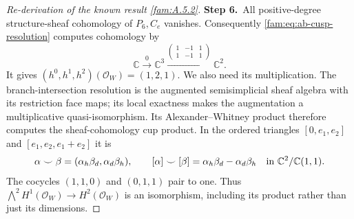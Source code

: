 \documentclass[11pt,a4paper]{article}
\theoremstyle{plain}
\theoremstyle{definition}
\begin{document}
\begin{proof}[Re-derivation of the known result \ref{fam:A.5.2}]
\par\smallskip\noindent\textbf{Step 6.}\ All positive-degree structure-sheaf cohomology of $P_6,C_e$ vanishes.
Consequently \eqref{fam:eq:ab-cusp-resolution} computes cohomology by
\[
 \mathbb C\xrightarrow{0}\mathbb C^3
 \xrightarrow{\left(\begin{smallmatrix}1&-1&1\\1&-1&1\end{smallmatrix}\right)}
 \mathbb C^2.
\]
It gives $(h^0,h^1,h^2)(\mathcal O_W)=(1,2,1)$.
We also need its multiplication. The branch-intersection resolution
is the augmented semisimplicial sheaf algebra with its restriction face
maps; its local exactness makes the augmentation a multiplicative
quasi-isomorphism. Its Alexander--Whitney product therefore computes
the sheaf-cohomology cup product. In the ordered triangles
$[0,e_1,e_2]$ and $[e_1,e_2,e_1+e_2]$ it is
\[
 \alpha\smile\beta=(\alpha_h\beta_d,\alpha_d\beta_h),
 \qquad [\alpha]\smile[\beta]
 =\alpha_h\beta_d-\alpha_d\beta_h
 \quad\hbox{in }\mathbb C^2/\mathbb C(1,1).
\]
The cocycles $(1,1,0)$ and $(0,1,1)$ pair to one. Thus
$\bigwedge^2H^1(\mathcal O_W)\to H^2(\mathcal O_W)$ is an
isomorphism, including its product rather than just its dimensions.


\end{proof}
\end{document}
